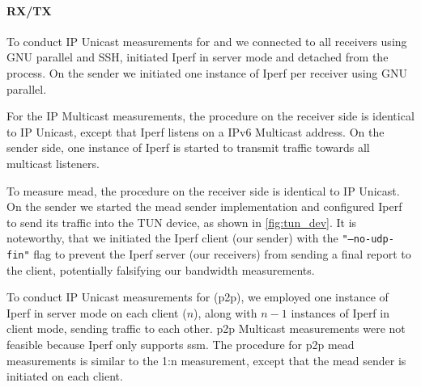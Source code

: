 \paragraph{RX/TX} %
\label{par:RX/TX}
To conduct IP Unicast measurements for \uci{} and \ucii{} we connected to all
    receivers using GNU parallel and SSH, initiated Iperf in server mode and
    detached from the process.
On the sender we initiated one instance of Iperf per receiver using GNU
    parallel.

For the IP Multicast measurements, the procedure on the receiver side is
    identical to IP Unicast, except that Iperf listens on a IPv6 Multicast
    address.
On the sender side, one instance of Iperf is started to transmit traffic
    towards all multicast listeners.

To measure \gls{mead}, the procedure on the receiver side is identical to IP
    Unicast.
On the sender we started the \gls{mead} sender implementation and configured
    Iperf to send its traffic into the TUN device, as shown in
    \autoref{fig:tun_dev}.
It is noteworthy, that we initiated the Iperf client (our sender) with the
    \texttt{"--no-udp-fin"} flag to prevent the Iperf server (our receivers)
    from sending a final report to the client, potentially falsifying our
    bandwidth measurements.

To conduct IP Unicast measurements for \uciii{} (\gls{p2p}), we employed one
    instance of Iperf in server mode on each client ($n$), along with $n-1$
    instances of Iperf in client mode, sending traffic to each other.
\gls{p2p} Multicast measurements were not feasible because Iperf only supports
    \gls{ssm}.
The procedure for \gls{p2p} \gls{mead} measurements is similar to the 1:n
    measurement, except that the \gls{mead} sender is initiated on each client.

